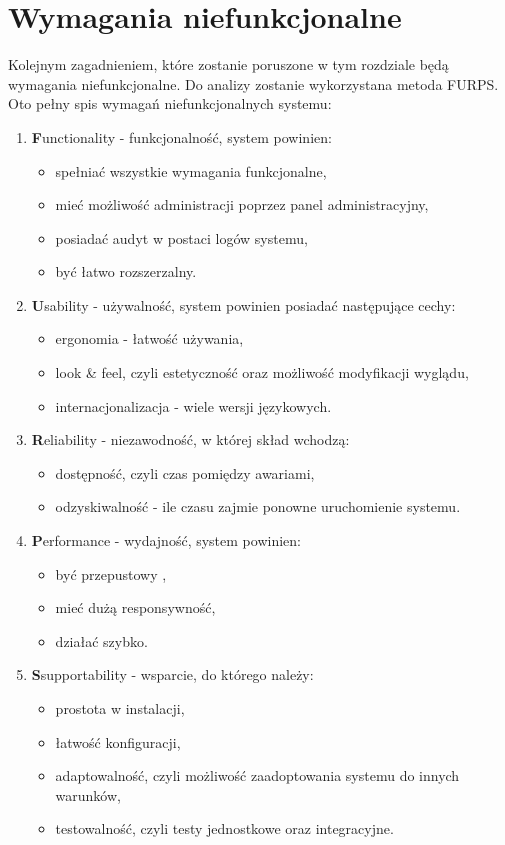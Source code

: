 \section{Wymagania niefunkcjonalne}
Kolejnym zagadnieniem, które zostanie poruszone w tym rozdziale będą wymagania niefunkcjonalne. Do analizy zostanie wykorzystana metoda FURPS. Oto pełny spis wymagań niefunkcjonalnych systemu:
\begin{enumerate}
	\item \textbf{F}unctionality - funkcjonalność, system powinien:
		\begin{itemize}
			\item spełniać wszystkie wymagania funkcjonalne,
			\item mieć możliwość administracji poprzez panel administracyjny,
			\item posiadać audyt w postaci logów systemu,
			\item być łatwo rozszerzalny.
		\end{itemize}
	\item \textbf{U}sability - używalność, system powinien posiadać następujące cechy:
		\begin{itemize}
			\item ergonomia - łatwość używania,
			\item look \& feel, czyli estetyczność oraz możliwość modyfikacji wyglądu,
			\item internacjonalizacja - wiele wersji językowych.
		\end{itemize}
	\item \textbf{R}eliability - niezawodność, w której skład wchodzą:
		\begin{itemize}
			\item dostępność, czyli czas pomiędzy awariami,
			\item odzyskiwalność - ile czasu zajmie ponowne uruchomienie systemu.
		\end{itemize}
	\item \textbf{P}erformance - wydajność, system powinien:
		\begin{itemize}
			\item być przepustowy ,
			\item mieć dużą responsywność,
			\item działać szybko.
		\end{itemize}
	\item \textbf{S}supportability - wsparcie, do którego należy:
		\begin{itemize}
			\item prostota w instalacji,
			\item łatwość konfiguracji,
			\item adaptowalność, czyli możliwość zaadoptowania systemu do innych warunków,
			\item testowalność, czyli testy jednostkowe oraz integracyjne.
		\end{itemize}
\end{enumerate}

